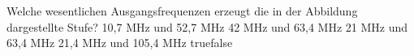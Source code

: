     {Welche wesentlichen Ausgangsfrequenzen erzeugt die in der Abbildung dargestellte Stufe?}
    {10,7 MHz und 52,7 MHz}
    {42 MHz und 63,4 MHz}
    {21 MHz und 63,4 MHz}
    {21,4 MHz und 105,4 MHz}
    {true}{false}